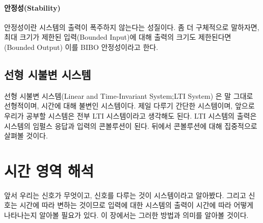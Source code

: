 \paragraph{안정성(Stability)}
안정성이란 시스템의 출력이 폭주하지 않는다는 성질이다. 
좀 더 구체적으로 말하자면, 최대 크기가 제한된 입력(Bounded Input)에 대해 출력의 크기도 제한된다면(Bounded Output) 이를 BIBO 안정성이라고 한다.
\subsection{선형 시불변 시스템}
선형 시불변 시스템(Linear and Time-Invariant System;LTI System) 은 말 그대로 선형적이며, 시간에 대해 불변인 시스템이다.
제일 다루기 간단한 시스템이며, 앞으로 우리가 공부할 시스템은 전부 LTI 시스템이라고 생각해도 된다.
LTI 시스템의 출력은 시스템의 임펄스 응답과 입력의 콘볼루션이 된다. 뒤에서 콘볼루션에 대해 집중적으로 살펴볼 것이다.

\section{시간 영역 해석}
앞서 우리는 신호가 무엇이고, 신호를 다루는 것이 시스템이라고 알아봤다. 그리고 신호는 시간에 따라 변하는 것이므로 입력에 대한 시스템의 출력이 시간에 따라 어떻게 나타나는지 알아볼 필요가 있다.
이 장에서는 그러한 방법과 의미를 알아볼 것이다.
